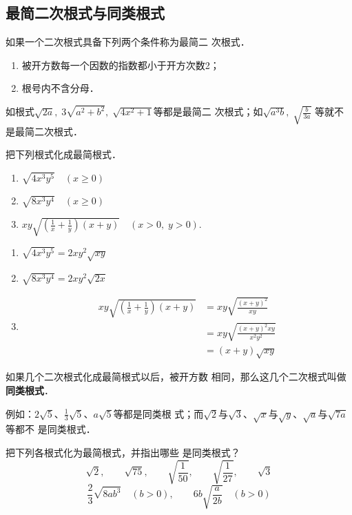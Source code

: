 \subsection{最简二次根式与同类根式}
如果一个二次根式具备下列两个条件称为最简二
次根式．
\begin{enumerate}
    \item 被开方数每一个因数的指数都小于开方次数2；
    \item 根号内不含分母．
\end{enumerate}

如根式$\sqrt{2a},\; 3\sqrt{a^2+b^2},\; \sqrt{4x^2+1}$等都是最简二
次根式；如$\sqrt{a^3b},\; \sqrt{\frac{b}{3a}}$
等就不是最简二次根式．

\begin{example}
    把下列根式化成最简根式．
\begin{enumerate}
    \item $\sqrt{4 x^{3} y^{5}}\quad (x \ge 0)$
    \item  $\sqrt{8 x^{3} y^{4}}\quad (x \ge 0)$
    \item  $x y \sqrt{\left(\frac{1}{x}+\frac{1}{y}\right)(x+y)} \quad(x>0, \; y>0)$.
\end{enumerate}
\end{example}

\begin{solution}
\begin{enumerate}
    \item $\sqrt{4 x^{3} y^{5}}=2 x y^{2} \sqrt{x y}$
    \item $\sqrt{8 x^{3} y^{4}}=2 x y^{2} \sqrt{2 x}$
    \item \[\begin{split}
    x y \sqrt{\left(\frac{1}{x}+\frac{1}{y}\right)(x+y)}
&=x y \sqrt{\frac{(x+y)^{2}}{x y}}\\
&={x} y \sqrt{\frac{(x+y)^{2} x y}{x^{2} y^{2}}}\\
&=(x+y) \sqrt{x y}
\end{split}\]
\end{enumerate}
    
\end{solution}

如果几个二次根式化成最简根式以后，被开方数
相同，那么这几个二次根式叫做\textbf{同类根式}．

例如：$2\sqrt{5}$、$\frac{1}{3}\sqrt{5}$、$a\sqrt{5}$等都是同类根
式；而$\sqrt{2}$与$\sqrt{3}$、$\sqrt{x}$与$\sqrt{y}$、$\sqrt{a}$与$\sqrt{7a}$等都不
是同类根式．

\begin{example}
    把下列各根式化为最简根式，并指出哪些
是同类根式？
\[\sqrt{2},\qquad \sqrt{75},\qquad \sqrt{\frac{1}{50}},\qquad \sqrt{\frac{1}{27}},\qquad \sqrt{3}\]
\[\frac{2}{3}\sqrt{8ab^3}\quad (b>0),\qquad 6b\sqrt{\frac{a}{2b}}\quad (b>0)\]
\end{example}



